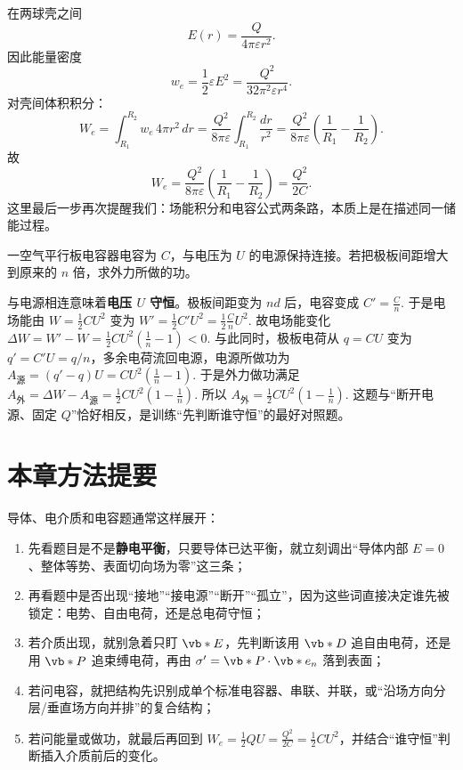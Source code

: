 \documentclass[lang=cn,11pt]{elegantbook}
\begin{document}
\begin{solution}
在两球壳之间
\[
E(r)=\frac{Q}{4\pi\varepsilon r^2}.
\]
因此能量密度
\[
w_e=\frac12 \varepsilon E^2
=\frac{Q^2}{32\pi^2\varepsilon r^4}.
\]
对壳间体积积分：
\[
W_e=\int_{R_1}^{R_2} w_e\,4\pi r^2\,dr
=\frac{Q^2}{8\pi\varepsilon}\int_{R_1}^{R_2}\frac{dr}{r^2}
=\frac{Q^2}{8\pi\varepsilon}\left(\frac{1}{R_1}-\frac{1}{R_2}\right).
\]
故
\[
\boxed{
W_e=\frac{Q^2}{8\pi\varepsilon}\left(\frac{1}{R_1}-\frac{1}{R_2}\right)
=\frac{Q^2}{2C}.
}
\]
这里最后一步再次提醒我们：场能积分和电容公式两条路，本质上是在描述同一储能过程。
\end{solution}

\begin{exercise}[电容器接着电源时拉大板距的外力做功]
一空气平行板电容器电容为 \(C\)，与电压为 \(U\) 的电源保持连接。若把极板间距增大到原来的 \(n\) 倍，求外力所做的功。
\end{exercise}

\begin{solution}
与电源相连意味着\textbf{电压 \(U\) 守恒}。极板间距变为 \(nd\) 后，电容变成
 \(C'=\frac{C}{n}.\) 
于是电场能由
 \(W=\frac12 CU^2\) 
变为
 \(W'=\frac12 C'U^2=\frac12\frac{C}{n}U^2.\) 
故电场能变化
 \(\Delta W=W'-W=\frac12 CU^2\left(\frac1n-1\right)<0.\) 
与此同时，极板电荷从 \(q=CU\) 变为 \(q'=C'U=q/n\)，多余电荷流回电源，电源所做功为
 \(A_{\text{源}}=(q'-q)U =CU^2\left(\frac1n-1\right).\) 
于是外力做功满足
 \(A_{\text{外}}=\Delta W-A_{\text{源}} =\frac12 CU^2\left(1-\frac1n\right).\) 
所以
 \(\boxed{ A_{\text{外}}=\frac12 CU^2\left(1-\frac1n\right). }\) 
这题与“断开电源、固定 \(Q\)”恰好相反，是训练“先判断谁守恒”的最好对照题。
\end{solution}

\section{本章方法提要}

导体、电介质和电容题通常这样展开：
\begin{enumerate}
 \item 先看题目是不是\textbf{静电平衡}，只要导体已达平衡，就立刻调出“导体内部 \(E=0\)、整体等势、表面切向场为零”这三条；
 \item 再看题中是否出现“接地”“接电源”“断开”“孤立”，因为这些词直接决定谁先被锁定：电势、自由电荷，还是总电荷守恒；
 \item 若介质出现，就别急着只盯 \(\vb*{E}\)，先判断该用 \(\vb*{D}\) 追自由电荷，还是用 \(\vb*{P}\) 追束缚电荷，再由 \(\sigma'=\vb*{P}\cdot\vb*{e}_n\) 落到表面；
 \item 若问电容，就把结构先识别成单个标准电容器、串联、并联，或“沿场方向分层/垂直场方向并排”的复合结构；
 \item 若问能量或做功，就最后再回到 \(W_e=\frac12 QU=\frac{Q^2}{2C}=\frac12 CU^2\)，并结合“谁守恒”判断插入介质前后的变化。
\end{enumerate}
\end{document}
